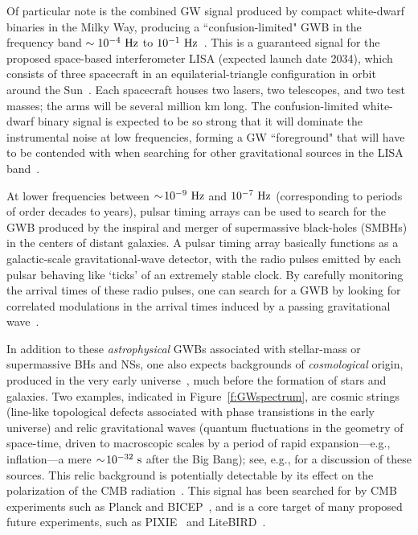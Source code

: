 Of particular note is the combined GW 
signal produced by compact white-dwarf binaries in 
the Milky Way, producing a ``confusion-limited" GWB
in the frequency band $\sim 10^{-4}~{\rm Hz}$ to 
$10^{-1}~{\rm Hz}$~\cite{Bender-Hils:1997}.
This is a guaranteed signal for the proposed 
space-based interferometer LISA (expected launch date 2034), 
which consists of three spacecraft in an 
equilaterial-triangle configuration 
in orbit around the Sun~\cite{LISA:web}.
Each spacecraft houses two lasers, two telescopes, and 
two test masses; 
the arms will be several million km long.
The confusion-limited 
white-dwarf binary signal is expected to be 
so strong that it will
dominate the instrumental noise at low frequencies, 
forming a GW ``foreground" that will
have to be contended with when searching for other 
gravitational sources in the LISA band~\cite{Adams-Cornish:2014}.

At lower frequencies between 
$\sim\!10^{-9}~{\rm Hz}$ and $10^{-7}~{\rm Hz}$
(corresponding to periods of order decades to years), 
pulsar timing arrays can be used to 
search for the GWB produced by the inspiral and merger 
of supermassive black-holes (SMBHs) in the centers of
distant galaxies.
A pulsar timing array basically functions as a 
galactic-scale gravitational-wave detector, with the
radio pulses emitted by each pulsar behaving like 
`ticks' of an extremely stable clock.
By carefully monitoring the arrival times of these
radio pulses, one can search for a GWB by looking for 
correlated modulations in the arrival times 
induced by a passing gravitational wave~\cite{Sazhin:1978, 
Detweiler:1979, Hellings-Downs:1983}.

In addition to these {\em astrophysical} GWBs 
associated with stellar-mass or supermassive BHs 
and NSs, one also expects backgrounds of 
{\em cosmological} origin, produced in the 
very early universe~\cite{Grishchuk:1976}, 
much before the formation of stars and galaxies.
Two examples, indicated in Figure~\ref{f:GWspectrum}, 
are cosmic strings (line-like topological defects 
associated with 
phase transistions in the early universe) and
relic gravitational waves (quantum 
fluctuations in the geometry of space-time, 
driven to macroscopic scales by a period of rapid 
expansion---e.g., inflation---a mere 
$\sim\!10^{-32}~{\rm s}$ after the Big Bang); 
see, e.g., \cite{Allen:1997, Maggiore:2000}
for a discussion of these sources.
This relic background is potentially detectable 
by its effect on the polarization of the CMB 
radiation~\cite{Seljak:1996gy}.
This signal has been searched for by CMB experiments
such as Planck and BICEP~\cite{BICEP/Keck:web}, 
and is a core target of many
proposed future experiments, such as PIXIE~\cite{pixie:2011} 
and LiteBIRD~\cite{litebird:web}.

